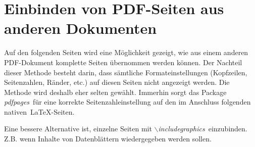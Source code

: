 \section{Einbinden von PDF-Seiten aus anderen Dokumenten}

Auf den folgenden Seiten wird eine Möglichkeit gezeigt, wie aus einem anderen PDF-Dokument komplette Seiten übernommen werden können. Der Nachteil dieser Methode besteht darin, dass sämtliche Formateinstellungen (Kopfzeilen, Seitenzahlen, Ränder, etc.) auf diesen Seiten nicht angezeigt werden. Die Methode wird deshalb eher selten gewählt. Immerhin sorgt das Package \textit{\glqq pdfpages\grqq}~für eine korrekte Seitenzahleinstellung auf den im Anschluss folgenden \glqq nativen\grqq~\LaTeX-Seiten.

Eine bessere Alternative ist, einzelne Seiten mit \textit{\glqq$\backslash$includegraphics\grqq}~einzubinden. Z.B. wenn Inhalte von Datenblättern wiedergegeben werden sollen.


